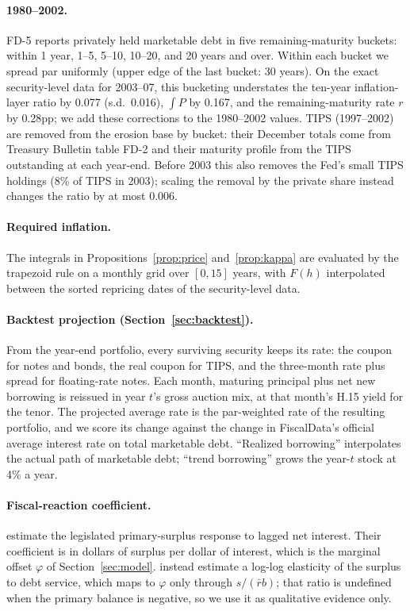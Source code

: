\paragraph{1980--2002.} FD-5 reports privately held marketable debt in five remaining-maturity buckets: within 1 year, 1--5, 5--10, 10--20, and 20 years and over. Within each bucket we spread par uniformly (upper edge of the last bucket: 30 years). On the exact security-level data for 2003--07, this bucketing understates the ten-year inflation-layer ratio by 0.077 (s.d.\ 0.016), $\int P$ by 0.167, and the remaining-maturity rate $r$ by 0.28pp; we add these corrections to the 1980--2002 values. TIPS (1997--2002) are removed from the erosion base by bucket: their December totals come from Treasury Bulletin table FD-2 and their maturity profile from the TIPS outstanding at each year-end. Before 2003 this also removes the Fed's small TIPS holdings (8\% of TIPS in 2003); scaling the removal by the private share instead changes the ratio by at most 0.006.

\paragraph{Required inflation.} The integrals in Propositions~\ref{prop:price} and~\ref{prop:kappa} are evaluated by the trapezoid rule on a monthly grid over $[0,15]$ years, with $F(h)$ interpolated between the sorted repricing dates of the security-level data.

\paragraph{Backtest projection (Section~\ref{sec:backtest}).} From the year-end portfolio, every surviving security keeps its rate: the coupon for notes and bonds, the real coupon for TIPS, and the three-month rate plus spread for floating-rate notes. Each month, maturing principal plus net new borrowing is reissued in year $t$'s gross auction mix, at that month's H.15 yield for the tenor. The projected average rate is the par-weighted rate of the resulting portfolio, and we score its change against the change in FiscalData's official average interest rate on total marketable debt. ``Realized borrowing'' interpolates the actual path of marketable debt; ``trend borrowing'' grows the year-$t$ stock at 4\% a year.

\paragraph{Fiscal-reaction coefficient.} \citet{auerbach2024} estimate the legislated primary-surplus response to lagged net interest. Their coefficient is in dollars of surplus per dollar of interest, which is the marginal offset $\varphi$ of Section~\ref{sec:model}. \citet{eichengreen2026} instead estimate a log-log elasticity of the surplus to debt service, which maps to $\varphi$ only through $s/(\bar r b)$; that ratio is undefined when the primary balance is negative, so we use it as qualitative evidence only.


